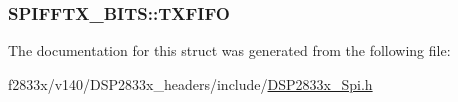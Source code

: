 \subsubsection[{T\+X\+F\+I\+F\+O}]{ S\+P\+I\+F\+F\+T\+X\+\_\+\+B\+I\+T\+S\+::\+T\+X\+F\+I\+F\+O}\label{struct_s_p_i_f_f_t_x___b_i_t_s_a3675cd8f14d266baa90e2ea1769cb202}


The documentation for this struct was generated from the following file\+:\begin{DoxyCompactItemize}
\item 
f2833x/v140/\+D\+S\+P2833x\+\_\+headers/include/\hyperlink{_d_s_p2833x___spi_8h}{D\+S\+P2833x\+\_\+\+Spi.\+h}\end{DoxyCompactItemize}
